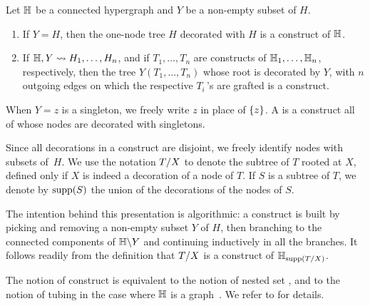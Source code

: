 \begin{definition} 
\label{inductive-construct}
Let ${\mathbb H}$ be a connected hypergraph and $Y$ be a non-empty subset of $H$.
\begin{enumerate}
\item  If $Y = H$, then the one-node tree $H$ decorated with $H$ is a construct of ${\mathbb H}$.
\item If ${\mathbb H},Y  \leadsto H_1,\ldots,H_n$, and if $T_1,\ldots,T_n$ are constructs of ${\mathbb H}_1,\ldots,{\mathbb H}_n$, respectively, then the
tree $Y(T_1,\ldots,T_n)$ whose root is decorated by $Y$, with $n$ outgoing edges on which the respective $T_i\,$'s are grafted is a construct.  
\end{enumerate}
When $Y={z}$ is a singleton, we freely write $z$ in place of $\left\{z\right\}$.
A  is a construct all of whose nodes are  decorated with singletons. 
\end{definition}

Since all decorations in a construct are disjoint, we freely identify nodes with subsets of~$H$. 
We use the notation $T/X$ to denote the  subtree of $T$ rooted at $X$, defined only if $X$ is indeed a decoration of a node of $T$. 
If $S$ is a subtree of $T$, we denote by $\operatorname{supp}(S)$ the union of the decorations of the nodes of $S$.

\begin{rem} \label{subconstruct-restriction}
The intention behind this presentation is algorithmic: a construct is built by picking and removing a non-empty subset $Y$ of $H$, then branching to the connected components of ${\mathbb H}\backslash Y$ and continuing inductively in all the branches.
It follows readily from the definition that $T/X$ is a construct of ${\mathbb H}_{\operatorname{supp}(T/X)}$.
\end{rem}

\begin{rem}
    The notion of construct is equivalent to the notion of nested set \cite{P09}, and to the notion of tubing in the case where ${\mathbb H}$ is a graph~\cite{CD-CCGA}.  
    We refer to \cite[Sec.~3.1]{COI} for details.
\end{rem}


